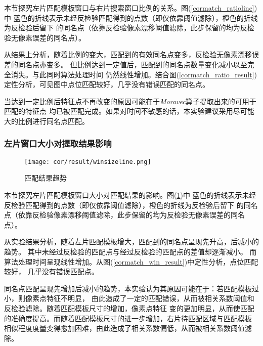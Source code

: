     本节探究左片匹配模板窗口与右片搜索窗口比例的关系。图(\ref{cormatch_ratioline})中
    蓝色的折线表示未经反检验匹配得到的点数（即仅依靠阈值滤除），橙色的折线为反检验后留下
    的同名点（依靠反检验像素漂移阈值滤除，此步保留的均为反检验无像素误差的同名点）。

    从结果上分析，随着比例的变大，匹配到的有效同名点变多，反检验无像素漂移误差的同名点亦变多。
    但比例达到一定值后，匹配到的同名点数量变化减小以至完全消失。与此同时算法处理时间
    仍然线性增加。结合图(\ref{cormatch_ratio_result})
    定性分析，可见图中点位匹配较好，几乎没有错误匹配的同名点。

    当达到一定比例后特征点不再改变的原因可能在于\textit{Moravec}算子提取出来的可用于匹配的特征点
    均已被匹配完成。如果对时间不敏感的话，本实验建议采用尽可能大的比例进行同名点匹配。

    \subsubsection{左片窗口大小对提取结果影响}

    \begin{figure}[H]
        \centering 
        \texttt{[image: cor/result/winsizeline.png]}
        \caption{匹配结果趋势}
        \label{cormatch_matchline}
    \end{figure}

    本节探究左片匹配模板窗口大小对匹配结果的影响。图(\ref{cormatch_matchline})中
    蓝色的折线表示未经反检验匹配得到的点数（即仅依靠阈值滤除），橙色的折线为反检验后留下
    的同名点（依靠反检验像素漂移阈值滤除，此步保留的均为反检验无像素误差的同名点）。

    从实验结果分析，随着左片匹配模板增大，匹配到的同名点呈现先升高，后减小的趋势。
    其中未经过反检验的匹配点与经过反检验的匹配点的差值却逐渐减小。
    而算法处理时间呈现线性增加。从图(\ref{cormatch_win_result})中定性分析，点位匹配较好，
    几乎没有错误匹配点。

    同名点匹配呈现先增加后减小的趋势，本实验认为其原因可能在于：若匹配模板过小，则像素点特征不明显，
    由此造成了一定的匹配错误，从而被相关系数阈值和反检验滤除。随着匹配模板尺寸的增加，像素点特征
    变的更加明显，从而使匹配的准确度提高。而随着匹配模板尺寸的进一步增加，右片待匹配区域与匹配模板
    相似程度度量变得愈加困难，由此造成了相关系数偏低，从而被相关系数阈值滤除。

